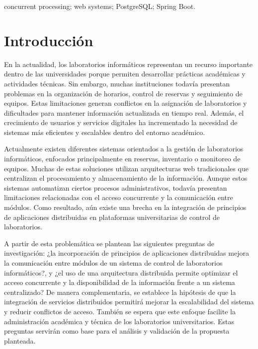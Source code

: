\documentclass[12pt,a4paper]{article}
\begin{document}
\vspace{0.01cm}

concurrent processing; web systems; PostgreSQL; Spring Boot.



\section{Introducción}

En la actualidad, los laboratorios informáticos representan un recurso importante dentro de las universidades porque permiten desarrollar prácticas académicas y actividades técnicas. Sin embargo, muchas instituciones todavía presentan problemas en la organización de horarios, control de reservas y seguimiento de equipos. Estas limitaciones generan conflictos en la asignación de laboratorios y dificultades para mantener información actualizada en tiempo real. Además, el crecimiento de usuarios y servicios digitales ha incrementado la necesidad de sistemas más eficientes y escalables dentro del entorno académico.

\vspace{0.2cm}

Actualmente existen diferentes sistemas orientados a la gestión de laboratorios informáticos, enfocados principalmente en reservas, inventario o monitoreo de equipos. Muchas de estas soluciones utilizan arquitecturas web tradicionales que centralizan el procesamiento y almacenamiento de la información. Aunque estos sistemas automatizan ciertos procesos administrativos, todavía presentan limitaciones relacionadas con el acceso concurrente y la comunicación entre módulos. Como resultado, aún existe una brecha en la integración de principios de aplicaciones distribuidas en plataformas universitarias de control de laboratorios.

\vspace{0.2cm}

A partir de esta problemática se plantean las siguientes preguntas de investigación: ¿la incorporación de principios de aplicaciones distribuidas mejora la comunicación entre módulos de un sistema de control de laboratorios informáticos?, y ¿el uso de una arquitectura distribuida permite optimizar el acceso concurrente y la disponibilidad de la información frente a un sistema centralizado? De manera complementaria, se establece la hipótesis de que la integración de servicios distribuidos permitirá mejorar la escalabilidad del sistema y reducir conflictos de acceso. También se espera que este enfoque facilite la administración académica y técnica de los laboratorios universitarios. Estas preguntas servirán como base para el análisis y validación de la propuesta planteada.
\end{document}
